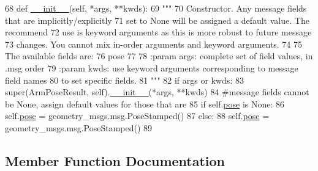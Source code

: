\begin{DoxyCode}
68   \textcolor{keyword}{def }\hyperlink{classjaco__msgs_1_1msg_1_1__ArmPoseResult_1_1ArmPoseResult_a34d4a7fadb6c745f213afc32de2732de}{\_\_init\_\_}(self, *args, **kwds):
69     \textcolor{stringliteral}{"""}
70 \textcolor{stringliteral}{    Constructor. Any message fields that are implicitly/explicitly}
71 \textcolor{stringliteral}{    set to None will be assigned a default value. The recommend}
72 \textcolor{stringliteral}{    use is keyword arguments as this is more robust to future message}
73 \textcolor{stringliteral}{    changes.  You cannot mix in-order arguments and keyword arguments.}
74 \textcolor{stringliteral}{}
75 \textcolor{stringliteral}{    The available fields are:}
76 \textcolor{stringliteral}{       pose}
77 \textcolor{stringliteral}{}
78 \textcolor{stringliteral}{    :param args: complete set of field values, in .msg order}
79 \textcolor{stringliteral}{    :param kwds: use keyword arguments corresponding to message field names}
80 \textcolor{stringliteral}{    to set specific fields.}
81 \textcolor{stringliteral}{    """}
82     \textcolor{keywordflow}{if} args \textcolor{keywordflow}{or} kwds:
83       super(ArmPoseResult, self).\hyperlink{classjaco__msgs_1_1msg_1_1__ArmPoseResult_1_1ArmPoseResult_a34d4a7fadb6c745f213afc32de2732de}{\_\_init\_\_}(*args, **kwds)
84       \textcolor{comment}{#message fields cannot be None, assign default values for those that are}
85       \textcolor{keywordflow}{if} self.\hyperlink{classjaco__msgs_1_1msg_1_1__ArmPoseResult_1_1ArmPoseResult_a1ecfceb51d3dc9aa38ea12a77158af38}{pose} \textcolor{keywordflow}{is} \textcolor{keywordtype}{None}:
86         self.\hyperlink{classjaco__msgs_1_1msg_1_1__ArmPoseResult_1_1ArmPoseResult_a1ecfceb51d3dc9aa38ea12a77158af38}{pose} = geometry\_msgs.msg.PoseStamped()
87     \textcolor{keywordflow}{else}:
88       self.\hyperlink{classjaco__msgs_1_1msg_1_1__ArmPoseResult_1_1ArmPoseResult_a1ecfceb51d3dc9aa38ea12a77158af38}{pose} = geometry\_msgs.msg.PoseStamped()
89 
\end{DoxyCode}


\subsection{Member Function Documentation}
